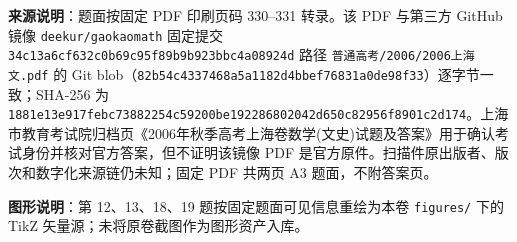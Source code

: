 


\begin{gktip}
\raggedright
\textbf{来源说明}：题面按固定 PDF 印刷页码 330–331 转录。该 PDF 与第三方 GitHub 镜像 \texttt{deekur/gaokaomath} 固定提交 \texttt{34c13a6cf632c0b69c95f89b9b923bbc4a08924d} 路径 \texttt{普通高考/2006/2006上海文.pdf} 的 Git blob（\texttt{82b54c4337468a5a1182d4bbef76831a0de98f33}）逐字节一致；SHA-256 为 \texttt{1881e13e917febc73882254c59200be192286802042d650c82956f8901c2d174}。上海市教育考试院归档页《2006年秋季高考上海卷数学(文史)试题及答案》用于确认考试身份并核对官方答案，但不证明该镜像 PDF 是官方原件。扫描件原出版者、版次和数字化来源链仍未知；固定 PDF 共两页 A3 题面，不附答案页。

\textbf{图形说明}：第 12、13、18、19 题按固定题面可见信息重绘为本卷 \texttt{figures/} 下的 TikZ 矢量源；未将原卷截图作为图形资产入库。
\end{gktip}


